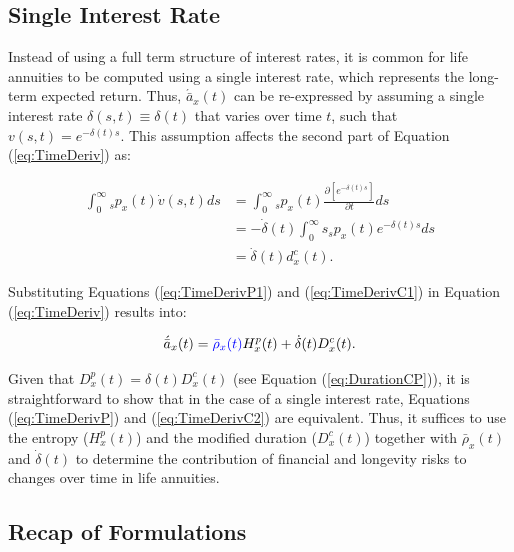 \documentclass[12pt]{article}
\newcommand{\revision}[1]{\textcolor{blue}{#1}}
\begin{document}
\subsection{Single Interest Rate}

Instead of using a full term structure of interest rates, it is common for life annuities to be computed using a single interest rate, which represents the long-term expected return. Thus, $\acute{\bar{a}}_x(t)$ can be re-expressed by assuming a single interest rate $\delta(s,t)\equiv \delta(t)$ that varies over time $t$, such that $v(s,t) = e^{-\delta(t) s}$. This assumption affects the second part of Equation (\ref{eq:TimeDeriv}) as:


\begin{equation}\label{eq:TimeDerivC1}
\begin{split}
\int_0^\infty {}_s{p}_x(t) \dot{v}(s,t)ds &=\int_0^\infty {}_s{p}_x(t) \frac{\partial \left[ e^{-\delta(t)s} \right]}{\partial t}ds \\
&=-\dot{\delta}(t)\int_0^\infty s  {}_s{p}_x(t) e^{-\delta(t)s} ds \\
&=  \dot{\delta}(t)  d^{c}_x(t).
\end{split}
\end{equation}

Substituting Equations (\ref{eq:TimeDerivP1}) and (\ref{eq:TimeDerivC1}) in Equation (\ref{eq:TimeDeriv}) results into: 


\begin{equation}\label{eq:TimeDerivC2}
\begin{split}
\acute{\bar{a}}_x(t) =  \revision{\bar{\rho}_x(t)}{H}^{p}_x(t)+\dot{\delta}(t)  D^{c}_x(t).
\end{split}
\end{equation}


Given that ${D}^{p}_{x}(t) = \delta(t){D}^{c}_{x}(t)$ (see Equation (\ref{eq:DurationCP})), it is straightforward to show that in the case of a single interest rate, Equations (\ref{eq:TimeDerivP}) and (\ref{eq:TimeDerivC2}) are equivalent. Thus, it suffices to use the entropy (${H}^{p}_x(t)$) and the modified duration (${D}^{c}_x(t)$) together with $\bar{\rho}_x(t)$ and $\dot{\delta}(t)$ to determine the contribution of financial and longevity risks to changes over time in life annuities.




\subsection{Recap of Formulations}
\end{document}
